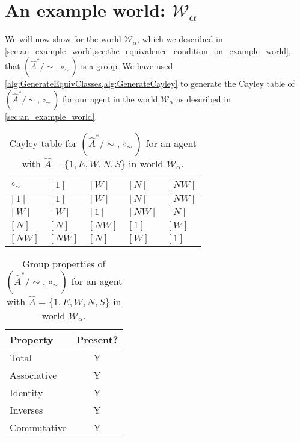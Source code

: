 \section{
An example world\texorpdfstring{: $\mathscr{W}_{\alpha}$}{}
}

We will now show for the world $\mathscr{W}_{\alpha}$, which we described in \cref{sec:an_example_world,sec:the_equivalence_condition_on_example_world}, that $(\hat{A}^{*}/\sim, \circ_{\sim})$ is a group.
We have used \cref{alg:GenerateEquivClasses,alg:GenerateCayley} to generate the Cayley table of $(\hat{A}^{*}/\sim, \circ_{\sim})$ for our agent in the world $\mathscr{W}_{\alpha}$ as described in \cref{sec:an_example_world}.

\begin{table}[H]
\centering
\begin{tabular}{l| llll}
    $\circ_{\sim}$ & $[1]$ & $[W]$  & $[N]$  & $[NW]$ \\
    \hline
    $[1]$ & $[1]$ & $[W]$  & $[N]$  & $[NW]$ \\
    $[W]$ & $[W]$ & $[1]$  & $[NW]$ & $[N]$  \\
    $[N]$ & $[N]$ & $[NW]$ & $[1]$  & $[W]$  \\
    $[NW]$ & $[NW]$ & $[N]$ & $[W]$  & $[1]$  \\
\end{tabular}
\caption{
Cayley table for $(\hat{A}^{*}/\sim, \circ_{\sim})$ for an agent with $\hat{A} = \{1, E, W, N, S \}$ in world $\mathscr{W}_{\alpha}$.
}
\end{table}

\begin{table}[H]
\centering
\begin{tabular}{l|c}
\textbf{Property} & \textbf{Present?} \\
\hline
Total & Y \\
Associative & Y \\
Identity & Y \\
Inverses & Y \\
\hline
Commutative & Y \\
\end{tabular}
\caption{
Group properties of $(\hat{A}^{*}/\sim, \circ_{\sim})$ for an agent with $\hat{A} = \{1, E, W, N, S \}$ in world $\mathscr{W}_{\alpha}$.
}
\label{tab:example_1_group_properties}
\end{table}


